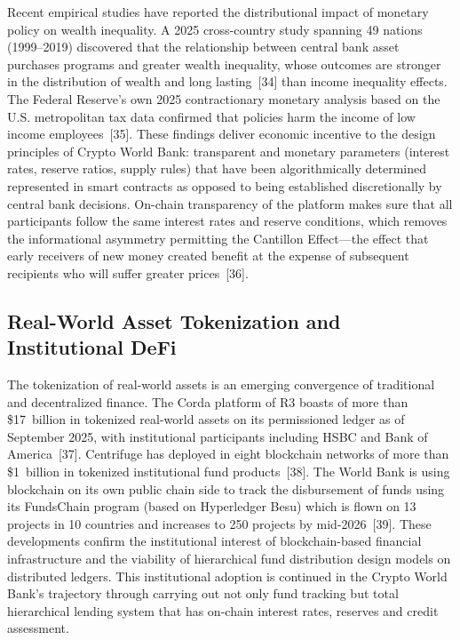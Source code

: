 \documentclass[12pt,a4paper]{report}
\begin{document}
Recent empirical studies have reported the distributional impact of monetary policy on wealth inequality. A 2025 cross-country study spanning 49 nations (1999--2019) discovered that the relationship between central bank asset purchases programs and greater wealth inequality, whose outcomes are stronger in the distribution of wealth and long lasting~[34] than income inequality effects. The Federal Reserve's own 2025 contractionary monetary analysis based on the U.S. metropolitan tax data confirmed that policies harm the income of low income employees~[35]. These findings deliver economic incentive to the design principles of Crypto World Bank: transparent and monetary parameters (interest rates, reserve ratios, supply rules) that have been algorithmically determined represented in smart contracts as opposed to being established discretionally by central bank decisions. On-chain transparency of the platform makes sure that all participants follow the same interest rates and reserve conditions, which removes the informational asymmetry permitting the Cantillon Effect---the effect that early receivers of new money created benefit at the expense of subsequent recipients who will suffer greater prices~[36].

\subsection{Real-World Asset Tokenization and Institutional DeFi}

The tokenization of real-world assets is an emerging convergence of traditional and decentralized finance. The Corda platform of R3 boasts of more than \$17~billion in tokenized real-world assets on its permissioned ledger as of September 2025, with institutional participants including HSBC and Bank of America~[37]. Centrifuge has deployed in eight blockchain networks of more than \$1~billion in tokenized institutional fund products~[38]. The World Bank is using blockchain on its own public chain side to track the disbursement of funds using its FundsChain program (based on Hyperledger Besu) which is flown on 13 projects in 10 countries and increases to 250 projects by mid-2026~[39]. These developments confirm the institutional interest of blockchain-based financial infrastructure and the viability of hierarchical fund distribution design models on distributed ledgers. This institutional adoption is continued in the Crypto World Bank's trajectory through carrying out not only fund tracking but total hierarchical lending system that has on-chain interest rates, reserves and credit assessment.
\end{document}
